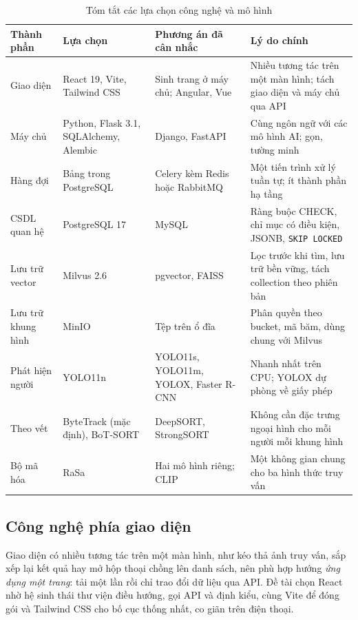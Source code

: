 \begin{table}[H]
\centering
\caption{Tóm tắt các lựa chọn công nghệ và mô hình}
\label{tab:tech-summary}
\begin{tabularx}{\textwidth}{|>{\raggedright\arraybackslash}p{3.0cm}|>{\raggedright\arraybackslash}p{3.1cm}|>{\raggedright\arraybackslash}p{3.4cm}|L|}
\hline
\textbf{Thành phần} & \textbf{Lựa chọn} & \textbf{Phương án đã cân nhắc} & \textbf{Lý do chính} \\
\hline
Giao diện & React 19, Vite, Tailwind CSS & Sinh trang ở máy chủ; Angular, Vue & Nhiều tương tác trên một màn hình; tách giao diện và máy chủ qua API \\
\hline
Máy chủ & Python, Flask 3.1, SQLAlchemy, Alembic & Django, FastAPI & Cùng ngôn ngữ với các mô hình AI; gọn, tường minh \\
\hline
Hàng đợi & Bảng trong PostgreSQL & Celery kèm Redis hoặc RabbitMQ & Một tiến trình xử lý tuần tự; ít thành phần hạ tầng \\
\hline
CSDL quan hệ & PostgreSQL 17 & MySQL & Ràng buộc CHECK, chỉ mục có điều kiện, JSONB, \texttt{SKIP LOCKED} \\
\hline
Lưu trữ vector & Milvus 2.6 & pgvector, FAISS & Lọc trước khi tìm, lưu trữ bền vững, tách collection theo phiên bản \\
\hline
Lưu trữ khung hình & MinIO & Tệp trên ổ đĩa & Phân quyền theo bucket, mã băm, dùng chung với Milvus \\
\hline
Phát hiện người & YOLO11n & YOLO11s, YOLO11m, YOLOX, Faster R-CNN & Nhanh nhất trên CPU; YOLOX dự phòng về giấy phép \\
\hline
Theo vết & ByteTrack (mặc định), BoT-SORT & DeepSORT, StrongSORT & Không cần đặc trưng ngoại hình cho mỗi người mỗi khung hình \\
\hline
Bộ mã hóa & RaSa & Hai mô hình riêng; CLIP & Một không gian chung cho ba hình thức truy vấn \\
\hline
\end{tabularx}
\end{table}

\subsection{Công nghệ phía giao diện}
\label{sec:6.1.1}

Giao diện có nhiều tương tác trên một màn hình, như kéo thả ảnh truy vấn, sắp xếp lại kết quả hay mở hộp thoại chồng lên danh sách, nên phù hợp hướng \emph{ứng dụng một trang}: tải một lần rồi chỉ trao đổi dữ liệu qua API. Đề tài chọn React nhờ hệ sinh thái thư viện điều hướng, gọi API và định kiểu, cùng Vite để đóng gói và Tailwind CSS cho bố cục thống nhất, co giãn trên điện thoại.


